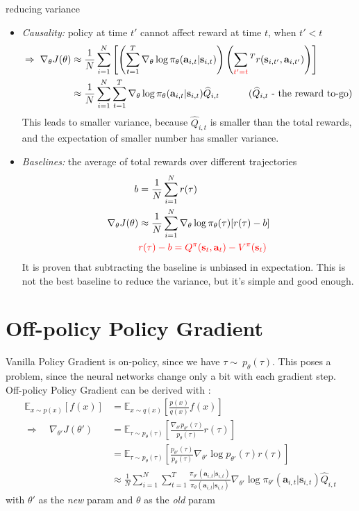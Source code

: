  reducing variance
\begin{itemize}
	\item \textit{Causality:} policy at time $t'$ cannot affect reward at time $t$, when $t'<t$
	\begin{align}
		\Rightarrow\; \nabla_\theta J(\theta) & \approx \frac{1}{N} \sum_{i=1}^{N} \left[ \left( \sum_{t=1}^{T} \nabla_\theta\log \pi_\theta(\textbf{a}_{i,t} | \textbf{s}_{i,t} ) \right) \left( \sum_{\color{red} t'=t}^{T} r(\textbf{s}_{i,t'}, \textbf{a}_{i,t'}) \right) \right]\\
		& \approx \frac{1}{N} \sum_{i=1}^{N} \sum_{t=1}^{T} \nabla_\theta\log \pi_\theta(\textbf{a}_{i,t} | \textbf{s}_{i,t} ) \widehat{Q}_{i,t} \qquad\quad (\widehat{Q}_{i,t} \text{ - the reward to-go})
		\label{eq:Q-value}
	\end{align}
	This leads to smaller variance, because $\widehat{Q}_{i,t}$ is smaller than the total rewards, and the expectation of smaller number has smaller variance.
	\item \textit{Baselines:} the average of total rewards over different trajectories
	\begin{align}
		b &= \frac{1}{N} \sum_{i=1}^{N}r(\tau)\\
		\nabla_\theta J(\theta) & \approx \frac{1}{N} \sum_{i=1}^{N} \nabla_\theta\log \pi_\theta(\tau) [r(\tau)-b]\\
		& {\color{red} r(\tau)-b = Q^\pi(\textbf{s}_t, \textbf{a}_t) - V^\pi(\textbf{s}_t)}
	\end{align}
	It is proven that subtracting the baseline is unbiased in expectation. This is not the best baseline to reduce the variance, but it's simple and good enough.
\end{itemize}

\section{Off-policy Policy Gradient}
\label{sec:off-policy-policy-gradient}
Vanilla Policy Gradient is on-policy, since we have $\tau\sim\ p_\theta(\tau)$. This poses a problem, since the neural networks change only a bit with each gradient step. Off-policy Policy Gradient can be derived with :
\begin{align}
	\mathbb{E}_{x\sim p(x)}[f(x)] &= \mathbb{E}_{x\sim q(x)} \left[\frac{p(x)}{q(x)}f(x)\right]\\
	\Rightarrow \quad \nabla_{\theta'} J(\theta') & = \mathbb{E}_{\tau \sim p_{\theta}(\tau)} \left[ \frac{\nabla_{\theta'} p_{\theta'}(\tau)}{p_{\theta}(\tau)} r(\tau) \right]\\
	&= \mathbb{E}_{\tau \sim p_{\theta}(\tau)} \left[ \frac{p_{\theta'}(\tau)}{p_{\theta}(\tau)} \nabla_{\theta'}\log p_{\theta'}(\tau) r(\tau) \right]\\
	&\approx \frac{1}{N} \sum_{i=1}^N \sum_{t=1}^T \frac{\pi_{\theta'}(\textbf{a}_{i,t} | \textbf{s}_{i,t})}{\pi_{\theta}(\textbf{a}_{i,t} | \textbf{s}_{i,t})} \nabla_{\theta'} \log \pi_{\theta'} (\textbf{a}_{i,t} | \textbf{s}_{i,t}) \widehat{Q}_{i,t}
\end{align}
with $\theta'$ as the \textit{new} \ac{param} and $\theta$ as the \textit{old} \ac{param}

